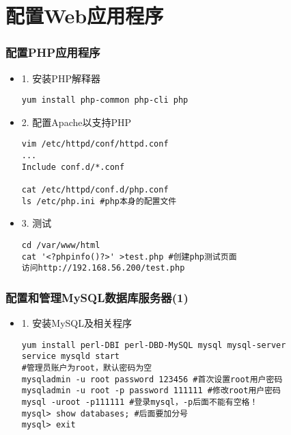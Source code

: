 \documentclass[xcolor=svgnames,presentation]{beamer}
\begin{document}
\section{配置Web应用程序}
\label{sec-2}
\begin{frame}[fragile]
\frametitle{配置PHP应用程序}
\label{sec-2-1}
\begin{itemize}

\item 1. 安装PHP解释器\\
\label{sec-2-1-1}%
\begin{verbatim}
yum install php-common php-cli php
\end{verbatim}

\item 2. 配置Apache以支持PHP\\
\label{sec-2-1-2}%
\begin{verbatim}
vim /etc/httpd/conf/httpd.conf
...
Include conf.d/*.conf

cat /etc/httpd/conf.d/php.conf
ls /etc/php.ini #php本身的配置文件
\end{verbatim}

\item 3. 测试\\
\label{sec-2-1-3}%
\begin{verbatim}
cd /var/www/html
cat '<?phpinfo()?>' >test.php #创建php测试页面
访问http://192.168.56.200/test.php
\end{verbatim}
\end{itemize} %
\end{frame}
\begin{frame}[fragile]
\frametitle{配置和管理MySQL数据库服务器(1)}
\label{sec-2-2}
\begin{itemize}

\item 1. 安装MySQL及相关程序\\
\label{sec-2-2-1}%
\begin{verbatim}
yum install perl-DBI perl-DBD-MySQL mysql mysql-server
service mysqld start
#管理员账户为root，默认密码为空
mysqladmin -u root password 123456 #首次设置root用户密码
mysqladmin -u root -p password 111111 #修改root用户密码
mysql -uroot -p111111 #登录mysql，-p后面不能有空格！
mysql> show databases; #后面要加分号
mysql> exit
\end{verbatim}
\end{itemize} %
\end{frame}
\end{document}

